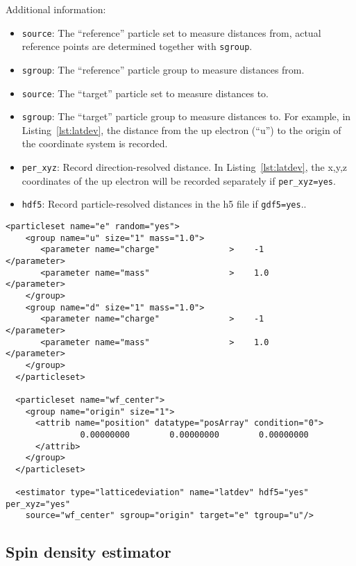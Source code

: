 Additional information:
\begin{itemize}
  \item{\texttt{source}: The ``reference'' particle set to measure distances from, actual reference points are determined together with \verb|sgroup|.}
  \item{\texttt{sgroup}: The ``reference'' particle group to measure distances from.} 
  \item{\texttt{source}: The ``target'' particle set to measure distances to.}
  \item{\texttt{sgroup}: The ``target'' particle group to measure distances to. For example, in Listing~\ref{lst:latdev}, the distance from the up electron (``u'') to the origin of the coordinate system is recorded.}
  \item{\texttt{per\_xyz}: Record direction-resolved distance. In Listing~\ref{lst:latdev}, the x,y,z coordinates of the up electron will be recorded separately if \texttt{per\_xyz=yes}.}
  \item{\texttt{hdf5}: Record particle-resolved distances in the h5 file if \texttt{gdf5=yes}.}.
\end{itemize}

\begin{lstlisting}[caption={Lattice deviation estimator element.},label={lst:latdev}]
  <particleset name="e" random="yes">
    <group name="u" size="1" mass="1.0">
       <parameter name="charge"              >    -1                    </parameter>
       <parameter name="mass"                >    1.0                   </parameter>
    </group>
    <group name="d" size="1" mass="1.0">
       <parameter name="charge"              >    -1                    </parameter>
       <parameter name="mass"                >    1.0                   </parameter>
    </group>
  </particleset>
  
  <particleset name="wf_center">
    <group name="origin" size="1">
      <attrib name="position" datatype="posArray" condition="0">
               0.00000000        0.00000000        0.00000000
      </attrib>
    </group>
  </particleset>
  
  <estimator type="latticedeviation" name="latdev" hdf5="yes" per_xyz="yes"
    source="wf_center" sgroup="origin" target="e" tgroup="u"/>
\end{lstlisting}

\subsection{Spin density estimator}

